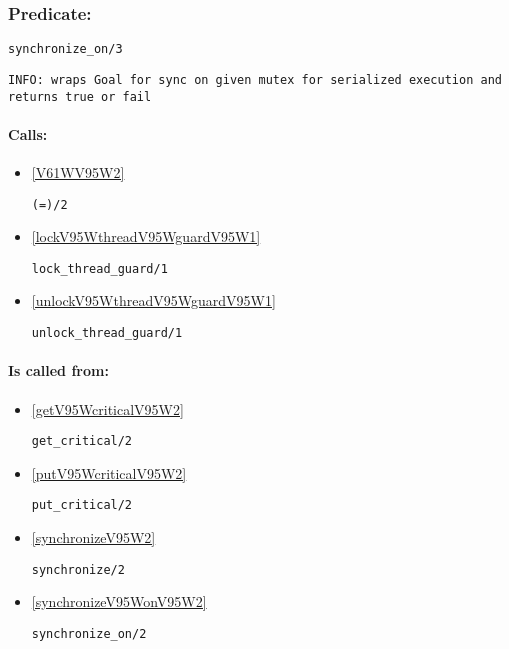 \subsubsection{Predicate:} \label{synchronizeV95WonV95W3}

\begin{verbatim}
synchronize_on/3
\end{verbatim}

{\small \begin{verbatim}
INFO: wraps Goal for sync on given mutex for serialized execution and returns true or fail

\end{verbatim}}
\paragraph{Calls:} 
\begin{itemize}
\item \ref{V61WV95W2} 
\begin{verbatim}
(=)/2
\end{verbatim}

\item \ref{lockV95WthreadV95WguardV95W1} 
\begin{verbatim}
lock_thread_guard/1
\end{verbatim}

\item \ref{unlockV95WthreadV95WguardV95W1} 
\begin{verbatim}
unlock_thread_guard/1
\end{verbatim}

\end{itemize}
\paragraph{Is called from:} 
\begin{itemize}
\item \ref{getV95WcriticalV95W2} 
\begin{verbatim}
get_critical/2
\end{verbatim}

\item \ref{putV95WcriticalV95W2} 
\begin{verbatim}
put_critical/2
\end{verbatim}

\item \ref{synchronizeV95W2} 
\begin{verbatim}
synchronize/2
\end{verbatim}

\item \ref{synchronizeV95WonV95W2} 
\begin{verbatim}
synchronize_on/2
\end{verbatim}

\end{itemize}

